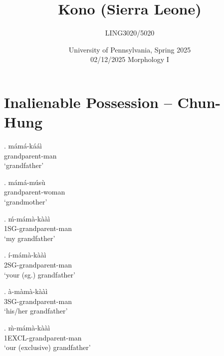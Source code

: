 \documentclass{assets/fieldnotes}
\title{Kono (Sierra Leone)}
\author{LING3020/5020}
\date{University of Pennsylvania, Spring 2025\\02/12/2025 Morphology I}
\begin{document}
\maketitle
\tableofcontents


\section{Inalienable Possession -- Chun-Hung} 




\ex. m\'{a}m\'{a}-k\'{a}\'{a}\`{i} \\
grandparent-man \\
`grandfather'

\ex. m\'{a}m\'{a}-m\'{u}s\`{u} \\
grandparent-woman \\
`grandmother'

\ex. \'{m}-m\'{a}m\`{a}-k\`{a}\`{a}\`{i} \\
1SG-grandparent-man \\
`my grandfather'

\ex. \'{i}-m\'{a}m\`{a}-k\`{a}\`{a}\`{i} \\
2SG-grandparent-man \\
`your (sg.) grandfather'

\ex. \`{a}-m\`{a}m\`{a}-k\`{a}\`{a}\`{i} \\
3SG-grandparent-man \\
`his/her grandfather'

\ex. \`{m}-m\'{a}m\`{a}-k\`{a}\`{a}\`{i} \\
1EXCL-grandparent-man \\
`our (exclusive) grandfather' 
\end{document}
